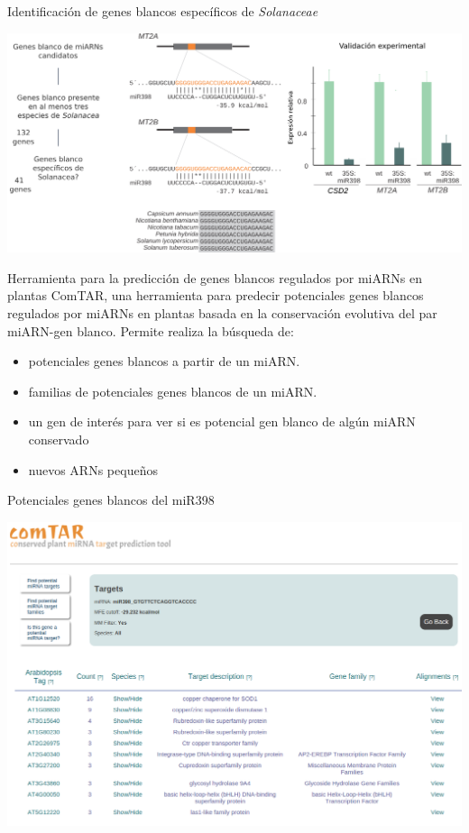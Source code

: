 \documentclass{beamer}
\begin{document}
\begin{frame}{Identificación de genes blancos específicos de \textit{Solanaceae}}
	\begin{center}
		\includegraphics[width=.8\textwidth]{img/Figure6_retocada.png}
	\end{center}
\end{frame}


\begin{frame}{Herramienta para la predicción de genes blancos regulados por miARNs en plantas}
ComTAR, una herramienta para predecir potenciales genes blancos regulados por miARNs en plantas basada en la conservación evolutiva del par miARN-gen blanco. Permite realiza la búsqueda de:

\begin{itemize}
    \item<2-> potenciales genes blancos a partir de un miARN.
    \item<2-> familias de potenciales genes blancos de un miARN.
    \item<2-> un gen de interés para ver si es potencial gen blanco de algún miARN conservado
    \item<2-> nuevos ARNs pequeños
\end{itemize}
    \begin{center}
    \end{center}
\end{frame}

\begin{frame}{Potenciales genes blancos del miR398}
	\begin{center}
		\includegraphics[width=.8\textwidth]{img/comTAR_find_targets.png}
	\end{center}
\end{frame}
\end{document}
